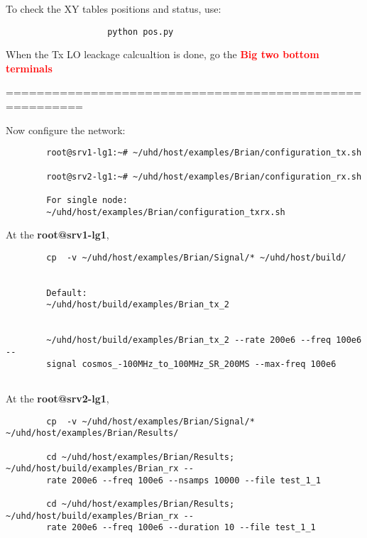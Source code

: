 \documentclass{article}
\begin{document}
        To check the XY tables positions and status, use:
        \begin{verbatim}
                    python pos.py
        \end{verbatim}
        
        
        \newpage
        When the Tx LO leackage calcualtion is done, go the \textbf{\textcolor{red}{Big two bottom terminals}}
        
        ========================================================
        
        Now configure the network:
        \begin{verbatim}
        root@srv1-lg1:~# ~/uhd/host/examples/Brian/configuration_tx.sh
        
        root@srv2-lg1:~# ~/uhd/host/examples/Brian/configuration_rx.sh
        
        For single node:
        ~/uhd/host/examples/Brian/configuration_txrx.sh
        \end{verbatim}
        
        
        At the \textbf{root@srv1-lg1}, 
        \begin{verbatim}
        cp  -v ~/uhd/host/examples/Brian/Signal/* ~/uhd/host/build/

        
        Default:
        ~/uhd/host/build/examples/Brian_tx_2

            
        ~/uhd/host/build/examples/Brian_tx_2 --rate 200e6 --freq 100e6 --
        signal cosmos_-100MHz_to_100MHz_SR_200MS --max-freq 100e6
        
        \end{verbatim}
        
        
        
        
        At the \textbf{root@srv2-lg1}, 
        \begin{verbatim}
        cp  -v ~/uhd/host/examples/Brian/Signal/* ~/uhd/host/examples/Brian/Results/
        
        cd ~/uhd/host/examples/Brian/Results; ~/uhd/host/build/examples/Brian_rx --
        rate 200e6 --freq 100e6 --nsamps 10000 --file test_1_1
        
        cd ~/uhd/host/examples/Brian/Results; ~/uhd/host/build/examples/Brian_rx --
        rate 200e6 --freq 100e6 --duration 10 --file test_1_1
        \end{verbatim}
        
\end{document}
